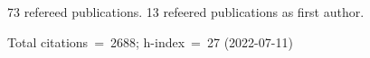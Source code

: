 73 refereed publications. 13 refeered publications as first author.

Total citations~=~2688; h-index~=~27 (2022-07-11)